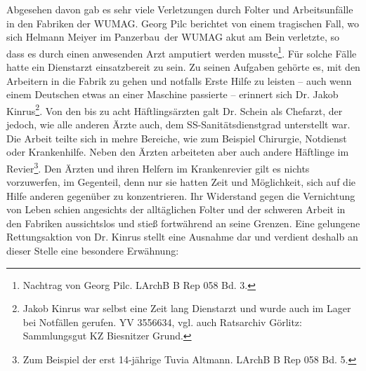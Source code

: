\documentclass[a4paper,12pt,ngerman,
]{nisebook}
\begin{document}
\newline
Abgesehen davon gab es sehr viele Verletzungen durch Folter und Arbeitsunfälle in den Fabriken der WUMAG. Georg Pilc berichtet von einem tragischen Fall, wo sich Helmann Meiyer im \glqq Panzerbau\grqq~der WUMAG akut am Bein verletzte, so dass es durch einen anwesenden Arzt amputiert werden musste\footnote{Nachtrag von Georg Pilc. LArchB B Rep 058 Bd. 3.}.
Für solche Fälle hatte ein Dienstarzt einsatzbereit zu sein.
Zu seinen Aufgaben gehörte es, mit den Arbeitern in die Fabrik zu gehen und notfalls Erste Hilfe zu leisten -- auch wenn einem Deutschen etwas an einer Maschine passierte -- erinnert sich Dr. Jakob Kinrus\footnote{Jakob Kinrus war selbst eine Zeit lang Dienstarzt und wurde auch im Lager bei Notfällen gerufen. YV 3556634, vgl. auch Ratsarchiv Görlitz: Sammlungsgut KZ Biesnitzer Grund.}.\newline
Von den bis zu acht Häftlingsärzten galt Dr. Schein als Chefarzt, der jedoch, wie alle anderen Ärzte auch, dem SS-Sanitätsdienstgrad unterstellt war. Die Arbeit teilte sich in mehre Bereiche, wie zum Beispiel Chirurgie, Notdienst oder Krankenhilfe. Neben den Ärzten arbeiteten aber auch andere Häftlinge im Revier\footnote{Zum Beispiel der erst 14-jährige Tuvia Altmann. LArchB B Rep 058 Bd. 5.}.
\newline
Den Ärzten und ihren Helfern im Krankenrevier gilt es nichts vorzuwerfen, im Gegenteil, denn nur sie hatten Zeit und Möglichkeit, sich auf die Hilfe anderen gegenüber zu konzentrieren. Ihr Widerstand gegen die Vernichtung von Leben schien angesichts der alltäglichen Folter und der schweren Arbeit in den Fabriken aussichtslos und stieß fortwährend an seine Grenzen. Eine gelungene Rettungsaktion von Dr. Kinrus stellt eine Ausnahme dar und verdient deshalb an dieser Stelle eine besondere Erwähnung:
\end{document}
